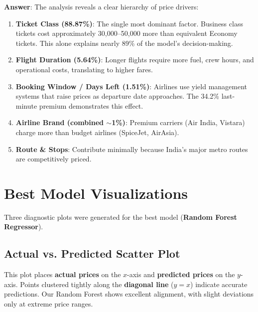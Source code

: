 \documentclass[12pt, a4paper]{article}
\newcommand{\rupee}{\text{₹}}
\begin{document}
\begin{insightbox}
\textbf{Answer}: The analysis reveals a clear hierarchy of price drivers:

\begin{enumerate}
    \item \textbf{Ticket Class (88.87\%)}: The single most dominant factor. Business class tickets cost approximately \rupee30,000--\rupee50,000 more than equivalent Economy tickets. This alone explains nearly 89\% of the model's decision-making.
    
    \item \textbf{Flight Duration (5.64\%)}: Longer flights require more fuel, crew hours, and operational costs, translating to higher fares.
    
    \item \textbf{Booking Window / Days Left (1.51\%)}: Airlines use yield management systems that raise prices as departure date approaches. The 34.2\% last-minute premium demonstrates this effect.
    
    \item \textbf{Airline Brand (combined $\sim$1\%)}: Premium carriers (Air India, Vistara) charge more than budget airlines (SpiceJet, AirAsia).
    
    \item \textbf{Route \& Stops}: Contribute minimally because India's major metro routes are competitively priced.
\end{enumerate}
\end{insightbox}

\newpage

\section{Best Model Visualizations}

Three diagnostic plots were generated for the best model (\textbf{Random Forest Regressor}).

\subsection{Actual vs. Predicted Scatter Plot}

This plot places \textbf{actual prices} on the $x$-axis and \textbf{predicted prices} on the $y$-axis. Points clustered tightly along the \textbf{diagonal line} ($y = x$) indicate accurate predictions. Our Random Forest shows excellent alignment, with slight deviations only at extreme price ranges.
\end{document}
